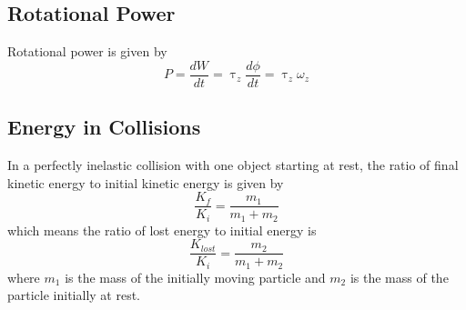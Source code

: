 \documentclass[../PhysicsFormulae]{subfiles}
\begin{document}
\subsection{Rotational Power}
Rotational power is given by
\[ P = \frac{dW}{dt} = \uptau_z \frac{d\phi}{dt} = \uptau_z \omega_z \]

\subsection{Energy in Collisions}
In a perfectly inelastic collision with one object starting at rest, the ratio of final kinetic energy to initial kinetic energy is given by
\[ \frac{K_f}{K_i} = \frac{m_1}{m_1 + m_2} \]
which means the ratio of lost energy to initial energy is
\[ \frac{K_{lost}}{K_i} = \frac{m_2}{m_1 + m_2} \]
where $m_1$ is the mass of the initially moving particle and $m_2$ is the mass of the particle initially at rest.
\end{document}
